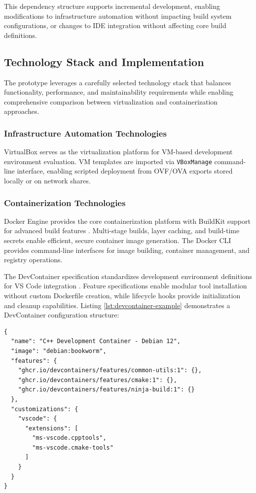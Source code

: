 This dependency structure supports incremental development, enabling modifications to infrastructure automation without impacting build system configurations, or changes to IDE integration without affecting core build definitions.

\subsection{Technology Stack and Implementation}

The prototype leverages a carefully selected technology stack that balances functionality, performance, and maintainability requirements while enabling comprehensive comparison between virtualization and containerization approaches.

\subsubsection{Infrastructure Automation Technologies}

VirtualBox serves as the virtualization platform for VM-based development environment evaluation.
VM templates are imported via \texttt{VBoxManage} command-line interface, enabling scripted deployment from OVF/OVA exports stored locally or on network shares.

\subsubsection{Containerization Technologies}

Docker Engine provides the core containerization platform with BuildKit support for advanced build features \citep{dockerDockerReferenceDocumentation2025}.
Multi-stage builds, layer caching, and build-time secrets enable efficient, secure container image generation.
The Docker CLI provides command-line interfaces for image building, container management, and registry operations.

The DevContainer specification standardizes development environment definitions for VS Code integration \citep{DevelopmentContainers2025}.
Feature specifications enable modular tool installation without custom Dockerfile creation, while lifecycle hooks provide initialization and cleanup capabilities.
Listing \ref{lst:devcontainer-example} demonstrates a DevContainer configuration structure:

\begin{lstlisting}[caption={DevContainer Configuration Structure},label=lst:devcontainer-example]
{
  "name": "C++ Development Container - Debian 12",
  "image": "debian:bookworm",
  "features": {
    "ghcr.io/devcontainers/features/common-utils:1": {},
    "ghcr.io/devcontainers/features/cmake:1": {},
    "ghcr.io/devcontainers/features/ninja-build:1": {}
  },
  "customizations": {
    "vscode": {
      "extensions": [
        "ms-vscode.cpptools",
        "ms-vscode.cmake-tools"
      ]
    }
  }
}
\end{lstlisting}

